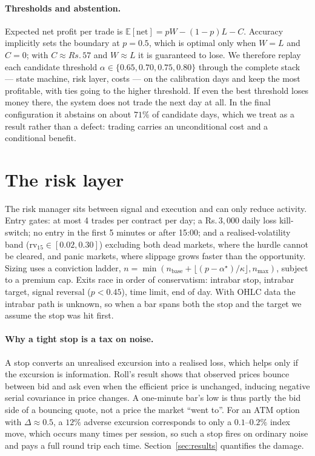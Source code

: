 \documentclass[10pt,a4paper]{article}
\newcommand{\rs}{Rs.\,}
\begin{document}
\paragraph{Thresholds and abstention.} Expected net profit per trade is
$\mathbb{E}[\text{net}] = pW - (1-p)L - C$.
Accuracy implicitly sets the boundary at $p=0.5$, which is optimal only when
$W=L$ and $C=0$; with $C\approx\rs 57$ and $W\approx L$ it is guaranteed to
lose. We therefore replay each candidate threshold
$\alpha\in\{0.65,0.70,0.75,0.80\}$ through the complete stack --- state
machine, risk layer, costs --- on the calibration days and keep the most
profitable, with ties going to the higher threshold. If even the best threshold
loses money there, the system does not trade the next day at all. In the final
configuration it abstains on about $71\%$ of candidate days, which we treat as
a result rather than a defect: trading carries an unconditional cost and a
conditional benefit.

\section{The risk layer}\label{sec:risk}

The risk manager sits between signal and execution and can only reduce
activity. Entry gates: at most 4 trades per contract per day; a \rs$3{,}000$
daily loss kill-switch; no entry in the first 5 minutes or after 15:00; and a
realised-volatility band ($\text{rv}_{15}\in[0.02,0.30]$) excluding both dead
markets, where the hurdle cannot be cleared, and panic markets, where slippage
grows faster than the opportunity. Sizing uses a conviction ladder,
$n = \min(n_{\text{base}} + \lfloor (p-\alpha^{\star})/\kappa \rfloor,
n_{\max})$, subject to a premium cap. Exits race in order of conservatism:
intrabar stop, intrabar target, signal reversal ($p<0.45$), time limit, end of
day. With OHLC data the intrabar path is unknown, so when a bar spans both the
stop and the target we assume the stop was hit first.

\paragraph{Why a tight stop is a tax on noise.} A stop converts an unrealised
excursion into a realised loss, which helps only if the excursion is
information. Roll's result \cite{roll} shows that observed prices bounce
between bid and ask even when the efficient price is unchanged, inducing
negative serial covariance in price changes. A one-minute bar's low is thus
partly the bid side of a bouncing quote, not a price the market ``went to''.
For an ATM option with $\Delta\approx0.5$, a $12\%$ adverse excursion
corresponds to only a $0.1$--$0.2\%$ index move, which occurs many times per
session, so such a stop fires on ordinary noise and pays a full round trip each
time. Section~\ref{sec:results} quantifies the damage.
\end{document}
